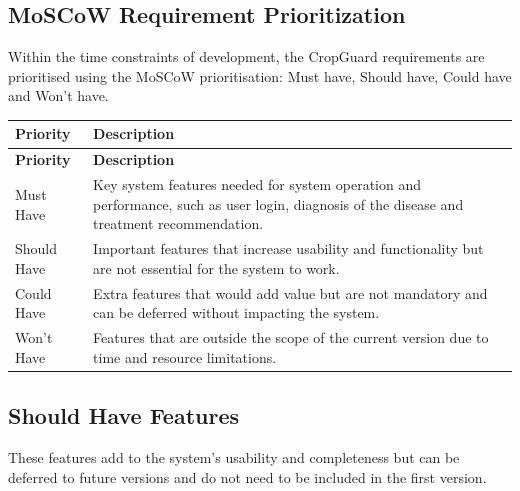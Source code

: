\documentclass[12pt,a4paper]{article}
\begin{document}
\subsection{MoSCoW Requirement Prioritization}

Within the time constraints of development, the CropGuard requirements are prioritised using the MoSCoW prioritisation: Must have, Should have, Could have and Won't have.

\begin{longtable}{|p{3cm}|p{10cm}|}
\hline
\rowcolor{lightgreen}
\textbf{Priority} & \textbf{Description} \\
\hline
\endfirsthead

\hline
\rowcolor{lightgreen}
\textbf{Priority} & \textbf{Description} \\
\hline
\endhead

Must Have &
Key system features needed for system operation and performance, such as user login, diagnosis of the disease and treatment recommendation. \\
\hline

Should Have &
Important features that increase usability and functionality but are not essential for the system to work. \\
\hline

Could Have &
Extra features that would add value but are not mandatory and can be deferred without impacting the system. \\
\hline

Won't Have &
Features that are outside the scope of the current version due to time and resource limitations. \\
\hline

\end{longtable}


\subsection{Should Have Features}

These features add to the system's usability and completeness but can be deferred to future versions and do not need to be included in the first version.
\end{document}
